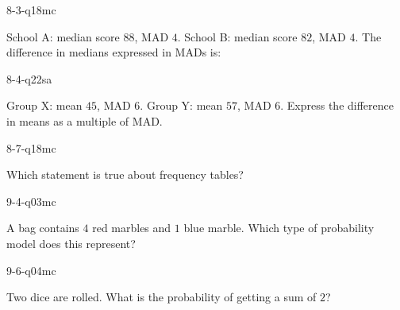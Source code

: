 \begin{practiceQuestion}{8-3-q18}{mc}
\begin{questionText}
School A: median score $88$, MAD $4$. School B: median score $82$, MAD $4$. The difference in medians expressed in MADs is:
\end{questionText}
\end{practiceQuestion}

\begin{practiceQuestion}{8-4-q22}{sa}
\begin{questionText}
Group X: mean $45$, MAD $6$. Group Y: mean $57$, MAD $6$. Express the difference in means as a multiple of MAD.
\end{questionText}
\end{practiceQuestion}

\begin{practiceQuestion}{8-7-q18}{mc}
\begin{questionText}
Which statement is true about frequency tables?
\end{questionText}
\end{practiceQuestion}

\begin{practiceQuestion}{9-4-q03}{mc}
\begin{questionText}
A bag contains $4$ red marbles and $1$ blue marble. Which type of probability model does this represent?
\end{questionText}
\end{practiceQuestion}

\begin{practiceQuestion}{9-6-q04}{mc}
\begin{questionText}
Two dice are rolled. What is the probability of getting a sum of $2$?
\end{questionText}
\end{practiceQuestion}

